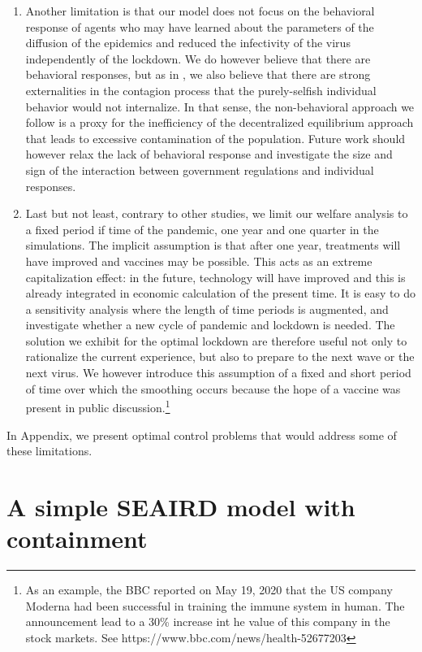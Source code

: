 \documentclass{amsart}
\begin{document}
\begin{enumerate}
\item Another limitation is that our model does not focus on the behavioral response of agents who may have learned about the parameters of the diffusion of the epidemics and reduced the 
infectivity of the virus independently of the lockdown. We do however believe that there are behavioral responses, but as in \cite{jones2020optimal}, we also believe that there are strong externalities in the contagion process that the purely-selfish individual behavior would not internalize. In that sense, the non-behavioral approach we follow is a proxy for the inefficiency of the decentralized equilibrium approach that leads to excessive contamination of the population. Future work should however relax the lack of behavioral response and investigate the size and sign of the interaction between government regulations and individual responses.

\item Last but not least, contrary to other studies, we limit our welfare analysis to a fixed period if time of the pandemic, one year and one quarter in the simulations. The implicit assumption is that after one year, treatments will have improved and vaccines may be possible. This acts as an extreme capitalization effect: in the future, technology will have improved and this is already integrated in economic calculation of the present time. It is easy to do  a sensitivity analysis where the length of time periods  is augmented, and investigate whether a new cycle of pandemic and lockdown is needed. The solution we exhibit for the optimal lockdown are therefore useful not only to rationalize the current experience, but also to prepare to the next wave or the next virus. We however introduce this assumption of a fixed and short period of time over which the smoothing occurs because the hope of a vaccine was present in public discussion.\footnote{As an example, the BBC reported on May 19, 2020 that the US company Moderna had been successful in training the immune system in human. The announcement lead to a 30\% increase int he value of this company in the stock markets. See
https://www.bbc.com/news/health-52677203}
\end{enumerate}

In Appendix, we present  optimal control problems that would address some of these limitations.



\section{A simple SEAIRD model with containment}
\end{document}
